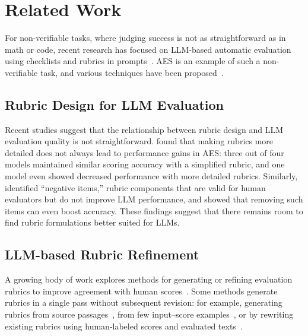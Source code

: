 \documentclass[11pt]{article}
\begin{document}
\section{Related Work}
For non-verifiable tasks, where judging success is not as straightforward as in math or code, recent research has focused on LLM-based automatic evaluation using checklists and rubrics in prompts~\citep{min-etal-2023-factscore,qin-etal-2024-infobench,lin2024wildbench,wu-etal-2025-lifbench,cook2025ticking,huang2025rubricanchors,gunjal2025rubricsasrewards,viswanathan2025checklistsbetterrewardmodels,lee2025checkeval,xu2025activecritics,liu-etal-2024-calibrating,liu-etal-2024-hd,wen-etal-2025-hpss}. AES is an example of such a non-verifiable task, and various techniques have been proposed~\citep{mizumoto2023aes,xie2024gradelikehuman,lee-etal-2024-unleashing}.

\subsection{Rubric Design for LLM Evaluation}
Recent studies suggest that the relationship between rubric design and LLM evaluation quality is not straightforward. \citet{yoshida2025rubrics} found that making rubrics more detailed does not always lead to performance gains in AES: three out of four models maintained similar scoring accuracy with a simplified rubric, and one model even showed decreased performance with more detailed rubrics. Similarly, \citet{furuhashi2025checklist} identified ``negative items,'' rubric components that are valid for human evaluators but do not improve LLM performance, and showed that removing such items can even boost accuracy. These findings suggest that there remains room to find rubric formulations better suited for LLMs.

\subsection{LLM-based Rubric Refinement}
A growing body of work explores methods for generating or refining evaluation rubrics to improve agreement with human scores~\citep{liu-etal-2024-hd,lee-etal-2024-unleashing,xie2024gradelikehuman,xu2025activecritics,liu-etal-2024-calibrating}. Some methods generate rubrics in a single pass without subsequent revision: for example, generating rubrics from source passages~\citep{lee-etal-2024-unleashing}, from few input--score examples~\citep{xu2025activecritics}, or by rewriting existing rubrics using human-labeled scores and evaluated texts~\citep{xie2024gradelikehuman}. 
\end{document}
